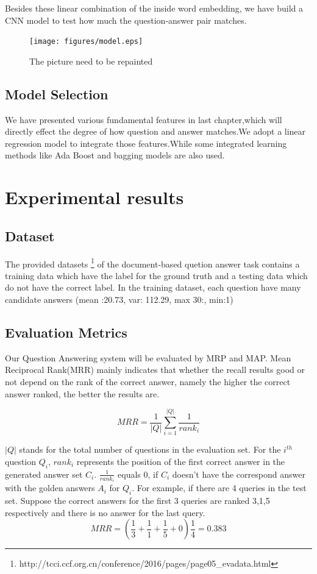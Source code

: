 \documentclass{llncs}
\begin{document}
Besides these linear combination of the inside word embedding, we have build a CNN model to test how much the question-answer pair matches.
\begin{figure}
\centering
\texttt{[image: figures/model.eps]}
\caption{ The picture need to be repainted}
\label{fig:model}
\end{figure}



\subsection{Model Selection}
\label{sec:model}

We have presented various fundamental features in last chapter,which will directly effect the degree of how question and answer matches.We adopt a linear regression model to integrate those features.While some integrated learning methods like Ada Boost and bagging models are also used.


\section{Experimental results}


\subsection{Dataset}

The provided datasets \footnote{ http://tcci.ccf.org.cn/conference/2016/pages/page05\_evadata.html} of the document-based quetion answer task contains a training data which have the label for the ground truth and a testing data which do not have the correct label.  In the training dataset, each question have many candidate answers (mean :20.73, var: 112.29, max 30:, min:1)


\subsection{Evaluation Metrics}
Our Question Answering system will be evaluated by MRP and MAP. Mean Reciprocal Rank(MRR) mainly indicates that whether the recall results good or not depend on the rank of the correct answer, namely the higher the correct answer ranked, the better the results are.

\begin{equation}
MRR=\frac{1}{|Q|}\sum_{i=1}^|Q|\frac{1}{rank_{i}}
\end{equation}

$|Q|$ stands for the total number of questions in the evaluation set. For the \(i^{th}\) question \(Q_{i}\), \(rank_{i}\) represents the position of the first correct answer in the generated answer set \(C_{i}\). \(\frac{1}{rank_{i}}\) equals 0, if \(C_{i}\) doesn't have the correspond answer with the golden answers \(A_{i}\) for \(Q_{i}\). For example, if there are 4 queries in the test set. Suppose the correct answers for the first 3 queries are ranked 3,1,5 respectively and there is no answer for the last query.
$$MRR=(\frac{1}{3}+\frac{1}{1}+\frac{1}{5}+0)\frac{1}{4}=0.383$$
\end{document}
